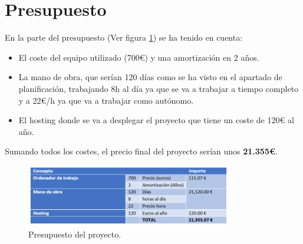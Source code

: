\section{Presupuesto}

En la parte del presupuesto (Ver figura \ref{fig:Presupuesto}) se ha tenido en cuenta:
\begin{itemize}
    \item El coste del equipo utilizado (700€) y una amortización en 2 años.
    \item La mano de obra, que serían 120 días como se ha visto en el apartado de planificación, trabajando 8h al día ya que se va a trabajar a tiempo completo y a 22€/h ya que va a trabajar como autónomo.
    \item El hosting donde se va a desplegar el proyecto que tiene un coste de 120€ al año.
\end{itemize}

Sumando todos los costes, el precio final del proyecto serían unos \textbf{21.355€}.

\begin{figure}[htb]
    \centering
    \includegraphics[width=0.8\textwidth]{imagenes/Presupuesto.png}
\caption{Presupuesto del proyecto.}
\label{fig:Presupuesto}
\end{figure}